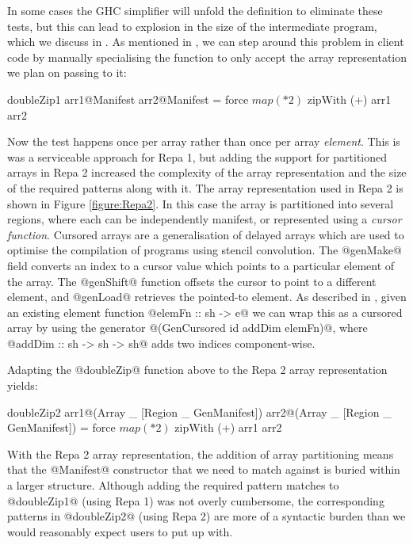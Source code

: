 In some cases the GHC simplifier will unfold the definition to eliminate these tests, but this can lead to explosion in the size of the intermediate program, which we discuss in \REF {}. As mentioned in \REF, we can step around this problem in client code by manually specialising the function to only accept the array representation we plan on passing to it:
%
\begin{small}
\begin{code}
    doubleZip1 arr1@Manifest{} arr2@Manifest{}
     = force $ map (* 2) $ zipWith (+) arr1 arr2
\end{code}
\end{small}
% 
Now the test happens once per array rather than once per array \emph{element}.
This is was a serviceable approach for Repa 1, but adding the support for partitioned arrays in Repa 2 increased the complexity of the array representation and the size of the required patterns along with it.  The array representation used in Repa 2 is shown in Figure \ref{figure:Repa2}. In this case the array is partitioned into several regions, where each can be independently manifest, or represented using a \emph{cursor function}. Cursored arrays are a generalisation of delayed arrays which are used to optimise the compilation of programs using stencil convolution. The @genMake@ field converts an index to a cursor value which points to a particular element of the array. The @genShift@ function offsets the cursor to point to a different element, and @genLoad@ retrieves the pointed-to element. As described in \cite{Lippmeier:Stencil}, given an existing element function  @elemFn :: sh -> e@ we can wrap this as a cursored array by using the generator @(GenCursored id addDim elemFn)@, where @addDim :: sh -> sh -> sh@ adds two indices component-wise.

Adapting the @doubleZip@ function above to the Repa 2 array representation yields:
%
\begin{small}
\begin{code}
    doubleZip2 arr1@(Array _ [Region _ GenManifest{}]) 
               arr2@(Array _ [Region _ GenManifest{}])
     = force $ map (* 2) $ zipWith (+) arr1 arr2
\end{code}
\end{small}
%
With the Repa 2 array representation, the addition of array partitioning means that the @Manifest@ constructor that we need to match against is buried within a larger structure. Although adding the required pattern matches to @doubleZip1@ (using Repa 1) was not overly cumbersome, the corresponding patterns in @doubleZip2@ (using Repa 2) are more of a syntactic burden than we would reasonably expect users to put up with. 


